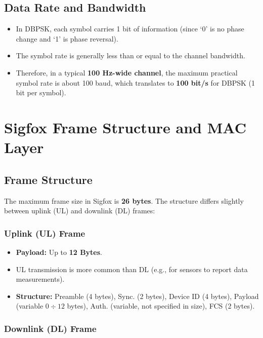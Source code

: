 \documentclass[a4paper, 12pt]{book} %
\begin{document}
\section{Data Rate and Bandwidth}\label{data-rate-and-bandwidth}

\begin{itemize}
\tightlist
\item
  In DBPSK, each symbol carries 1 bit of information (since `0' is no
  phase change and `1' is phase reversal).
\item
  The symbol rate is generally less than or equal to the channel
  bandwidth.
\item
  Therefore, in a typical \textbf{100 Hz-wide channel}, the maximum
  practical symbol rate is about 100 baud, which translates to
  \textbf{100 bit/s} for DBPSK (1 bit per symbol).
\end{itemize}

\chapter{Sigfox Frame Structure and MAC
Layer}\label{sigfox-frame-structure-and-mac-layer}

\section{Frame Structure}\label{frame-structure}

The maximum frame size in Sigfox is \textbf{26 bytes}. The structure
differs slightly between uplink (UL) and downlink (DL) frames:

\subsection{Uplink (UL) Frame}\label{uplink-ul-frame}

\begin{itemize}
\tightlist
\item
  \textbf{Payload:} Up to \textbf{12 Bytes}.
\item
  UL transmission is more common than DL (e.g., for sensors to report
  data measurements).
\item
  \textbf{Structure:} Preamble (4 bytes), Sync. (2 bytes), Device ID (4
  bytes), Payload (variable \(0\div12\) bytes), Auth. (variable, not
  specified in size), FCS (2 bytes).
\end{itemize}

\subsection{Downlink (DL) Frame}\label{downlink-dl-frame}
\end{document}
